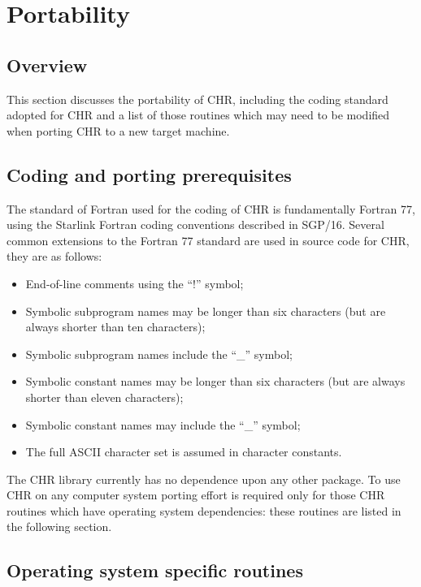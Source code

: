 \newpage

\section {Portability}

\subsection {Overview}

This section discusses the portability of CHR, including the coding 
standard adopted for CHR and a list of those routines which 
may need to be modified when porting CHR to a new target machine.


\subsection {Coding and porting prerequisites}

The standard of Fortran used for the coding of CHR is fundamentally
Fortran 77, using the Starlink Fortran coding conventions described in SGP/16.
Several common extensions to the Fortran 77 standard are used in source 
code for CHR, they are as follows:

\begin {itemize}
\item End-of-line comments using the ``!'' symbol;
\item Symbolic subprogram names may be longer than six characters (but are 
always shorter than ten characters);
\item Symbolic subprogram names include the ``\_'' symbol;
\item Symbolic constant names may be longer than six characters (but are always
shorter than eleven characters);
\item Symbolic constant names may include the ``\_'' symbol;
\item The full ASCII character set is assumed in character constants.
\end {itemize}

The CHR library currently has no dependence upon any other package.
To use CHR on any computer system porting effort is required only for those 
CHR routines which have operating system dependencies: these routines are
listed in the following section.


\subsection {Operating system specific routines}

